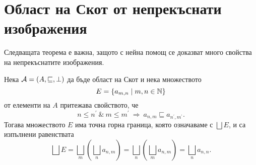 \section{Област на Скот от непрекъснати изображения}

Следващата теорема е важна, защото с нейна помощ се доказват много свойства на непрекъснатите изображения.

\begin{thm}
  \label{th:double-chain}
  Нека $\mathcal{A} = (A,\sqsubseteq,\bot)$ да бъде област на Скот и нека множеството 
  \[E = \{a_{m,n} \mid m,n \in \mathbb{N}\}\]
  от елементи на $A$ притежава свойството, че 
  \[n \leq n^\prime\ \&\ m \leq m^\prime\ \Rightarrow\ a_{n,m} \sqsubseteq a_{n^\prime,m^\prime}.\]
  Тогава множеството $E$ има точна горна граница, която означаваме с $\bigsqcup E$, и са изпълнени равенствата
  \[\bigsqcup E = \bigsqcup_m(\bigsqcup_n a_{n,m}) = \bigsqcup_n(\bigsqcup_{m} a_{n,m}) = \bigsqcup_n a_{n,n}.\]
\end{thm}
